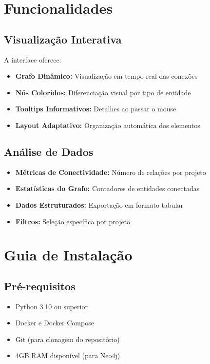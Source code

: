 \documentclass[12pt,a4paper]{article}
\begin{document}
\section{Funcionalidades}

\subsection{Visualização Interativa}

A interface oferece:

\begin{itemize}
    \item \textbf{Grafo Dinâmico:} Visualização em tempo real das conexões
    \item \textbf{Nós Coloridos:} Diferenciação visual por tipo de entidade
    \item \textbf{Tooltips Informativos:} Detalhes ao passar o mouse
    \item \textbf{Layout Adaptativo:} Organização automática dos elementos
\end{itemize}

\subsection{Análise de Dados}

\begin{itemize}
    \item \textbf{Métricas de Conectividade:} Número de relações por projeto
    \item \textbf{Estatísticas do Grafo:} Contadores de entidades conectadas
    \item \textbf{Dados Estruturados:} Exportação em formato tabular
    \item \textbf{Filtros:} Seleção específica por projeto
\end{itemize}

\section{Guia de Instalação}

\subsection{Pré-requisitos}

\begin{itemize}
    \item Python 3.10 ou superior
    \item Docker e Docker Compose
    \item Git (para clonagem do repositório)
    \item 4GB RAM disponível (para Neo4j)
\end{itemize}
\end{document}
